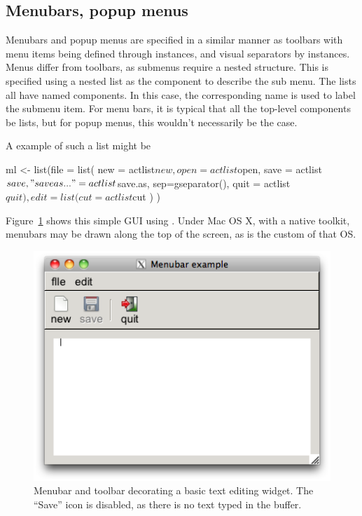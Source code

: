 \subsection{Menubars, popup menus}
\label{sec:gWidgets-menubars}

Menubars and popup menus are specified in a similar manner as toolbars with menu items
being defined through  instances, and visual separators
by  instances. Menus differ from toolbars, as
submenus require a nested structure. This  is specified using a
nested list as the component to describe the sub menu. The lists all
have named components. In this case, the corresponding name is used to
label the submenu item. For menu bars, it is typical that all the
top-level components be lists, but for popup menus, this wouldn't
necessarily be the case.

A example of such a list might be
\begin{Schunk}
\begin{Sinput}
 ml <- list(file = list(
              new = actlist$new,
              open = actlist$open,
              save = actlist$save,
              "save as..." = actlist$save.as,
              sep=gseparator(),
              quit = actlist$quit
              ),
            edit = list(
              cut = actlist$cut
              )
            )
 
\end{Sinput}
\end{Schunk}


Figure~\ref{fig:fig-gWidgets-menubar-disabled} shows this simple GUI
using .  Under Mac OS X, with a native toolkit,
menubars may be drawn along the top of the screen, as is the custom of
that OS.

\begin{figure}
  \centering
  \includegraphics[width=.5\textwidth]{fig-gWidgets-menubar-disabled.png}
  \caption{Menubar and toolbar decorating a basic text editing
    widget. The ``Save'' icon is disabled, as there is no text typed
    in the buffer.}
  \label{fig:fig-gWidgets-menubar-disabled}
\end{figure}

